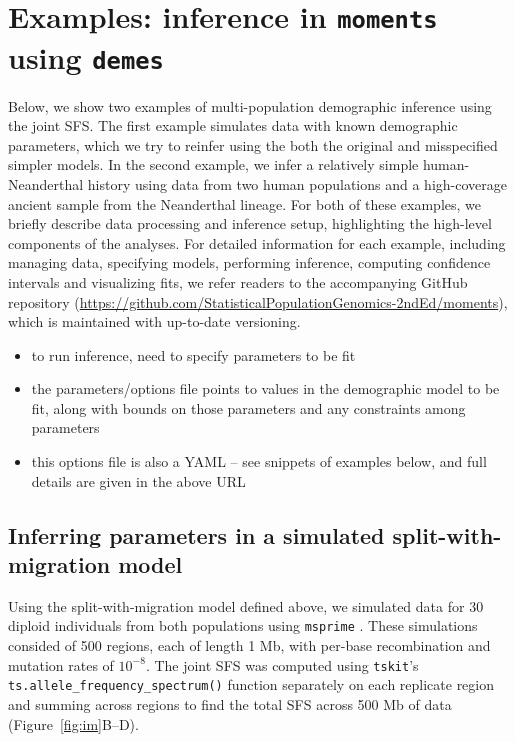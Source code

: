 \documentclass[]{article}
\newcommand{\moments}{\texttt{moments}\xspace}
\newcommand{\demes}{\texttt{demes}\xspace}
\newcommand{\msprime}{\texttt{msprime}\xspace}
\newcommand{\tskit}{\texttt{tskit}\xspace}
\begin{document}
\section*{Examples: inference in \moments using \demes}

Below, we show two examples of multi-population demographic inference using the
joint SFS. The first example simulates data with known demographic parameters,
which we try to reinfer using the both the original and misspecified simpler
models. In the second example, we infer a relatively simple human-Neanderthal
history using data from two human populations and a high-coverage ancient
sample from the Neanderthal lineage. For both of these examples, we briefly
describe data processing and inference setup, highlighting the high-level
components of the analyses. For detailed information for each example,
including managing data, specifying models, performing inference, computing
confidence intervals and visualizing fits, we refer readers to the accompanying
GitHub repository
(\url{https://github.com/StatisticalPopulationGenomics-2ndEd/moments}), which
is maintained with up-to-date versioning.

\begin{itemize}
    \item to run inference, need to specify parameters to be fit
    \item the parameters/options file points to values in the demographic model
        to be fit, along with bounds on those parameters and any constraints
        among parameters
    \item this options file is also a YAML -- see snippets of examples below, and
        full details are given in the above URL
\end{itemize}

\subsection*{Inferring parameters in a simulated split-with-migration model}

Using the split-with-migration model defined above, we simulated data for 30
diploid individuals from both populations using \msprime
\citep{baumdicker2022efficient}. These simulations consided of 500 regions,
each of length 1 Mb, with per-base recombination and mutation rates of
$10^{-8}$. The joint SFS was computed using \tskit's
\texttt{ts.allele\_frequency\_spectrum()} function separately on each replicate
region and summing across regions to find the total SFS across 500 Mb of data
(Figure~\ref{fig:im}B--D). 
\end{document}
